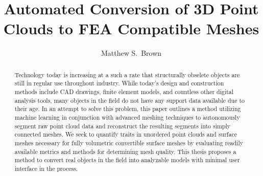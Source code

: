 \documentclass[12pt]{drexelthesis}
\title{Automated Conversion of 3D Point Clouds to FEA Compatible Meshes}
\author{Matthew S.~Brown}
\begin{document}
\maketitle
\begin{preliminary}

\newpage

\setcounter{page}{2}

\date{} %

\begin{dedication}

\end{dedication}

\begin{acknowledgements}

\end{acknowledgements}


\mytableofcontents\newpage


\setlength{\baselineskip}{0.5\baselineskip}
\listoftables \newpage


\listoffigures \newpage
\setlength{\baselineskip}{2.0\baselineskip}

\begin{abstract}
Technology today is increasing at a such a rate that structurally obselete objects are still in regular use throughout industry. While today's design and construction methods include CAD drawings, finite element models, and countless other digital analysis tools, many objects in the field do not have any support data available due to their age. In an attempt to solve this problem, this paper outlines a method utilizing machine learning in conjunction with advanced meshing techniques to autonomously segment raw point cloud data and reconstruct the resulting segments into simply connected meshes. We seek to quantify traits in unordered point clouds and surface meshes necessary for fully volumetric convertible surface meshes by evaluating readily available metrics and methods for determining mesh quality. This thesis proposes a method to convert real objects in the field into analyzable models with minimal user interface in the process.

\end{abstract}

\clearpage
\end{preliminary}
\thispagestyle{empty}
\newpage
\end{document}
